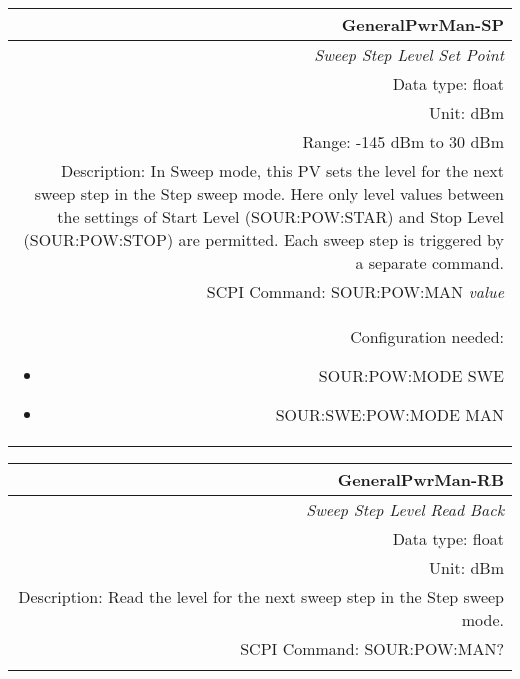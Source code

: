 \documentclass[openany]{article}
\begin{document}
		\begin{tabular}{N}
			\hline
			\bfseries GeneralPwrMan-SP \\ \hline
			\emph{Sweep Step Level Set Point} \\
			Data type: float \\
			Unit: dBm \\
			Range: -145 dBm to 30 dBm \\
			Description: In Sweep mode, this PV sets the level for the next sweep step in the Step sweep mode. Here only level values between the settings of  Start Level (SOUR:POW:STAR) and Stop Level (SOUR:POW:STOP) are permitted. Each sweep step is triggered by a separate command. \\
			SCPI Command: SOUR:POW:MAN \emph{value} \\
			Configuration needed:
				\begin{itemize}[noitemsep]
				\small
				\item[] SOUR:POW:MODE SWE
				\item[] SOUR:SWE:POW:MODE MAN
				\end{itemize} \\

		\end{tabular}


		\begin{tabular}{N}
			\hline
			\bfseries GeneralPwrMan-RB \\ \hline
			\emph{Sweep Step Level Read Back} \\
			Data type: float \\
			Unit: dBm \\
			Description: Read the level for the next sweep step in the Step sweep mode. \\
			SCPI Command: SOUR:POW:MAN? \\
			\\

		\end{tabular}
\end{document}
